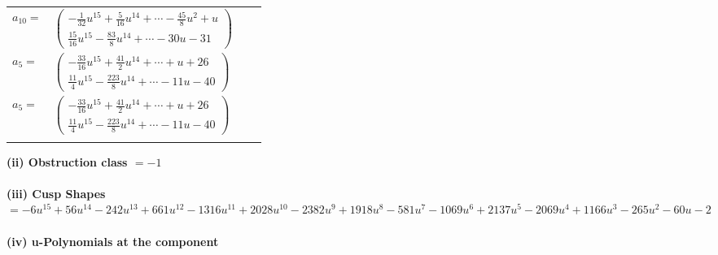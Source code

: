 \documentclass[1p]{elsarticle_modified}
\theoremstyle{definition}
\begin{document}
\begin{tabular}{m{7pt} m{180pt} m{7pt} m{180pt} }
\flushright $a_{10}=$&$\begin{pmatrix}-\frac{1}{32} u^{15}+\frac{5}{16} u^{14}+\cdots-\frac{45}{8} u^2+u\\\frac{15}{16} u^{15}-\frac{83}{8} u^{14}+\cdots-30 u-31\end{pmatrix}$ \\
\flushright $a_{5}=$&$\begin{pmatrix}-\frac{33}{16} u^{15}+\frac{41}{2} u^{14}+\cdots+u+26\\\frac{11}{4} u^{15}-\frac{223}{8} u^{14}+\cdots-11 u-40\end{pmatrix}$\\ \flushright $a_{5}=$&$\begin{pmatrix}-\frac{33}{16} u^{15}+\frac{41}{2} u^{14}+\cdots+u+26\\\frac{11}{4} u^{15}-\frac{223}{8} u^{14}+\cdots-11 u-40\end{pmatrix}$\\&\end{tabular}
\flushleft \textbf{(ii) Obstruction class $= -1$}\\~\\
\flushleft \textbf{(iii) Cusp Shapes $= -6 u^{15}+56 u^{14}-242 u^{13}+661 u^{12}-1316 u^{11}+2028 u^{10}-2382 u^9+1918 u^8-581 u^7-1069 u^6+2137 u^5-2069 u^4+1166 u^3-265 u^2-60 u-2$}\\~\\
\newpage\renewcommand{\arraystretch}{1}
\flushleft \textbf{(iv) u-Polynomials at the component}\newline \\
\end{document}
